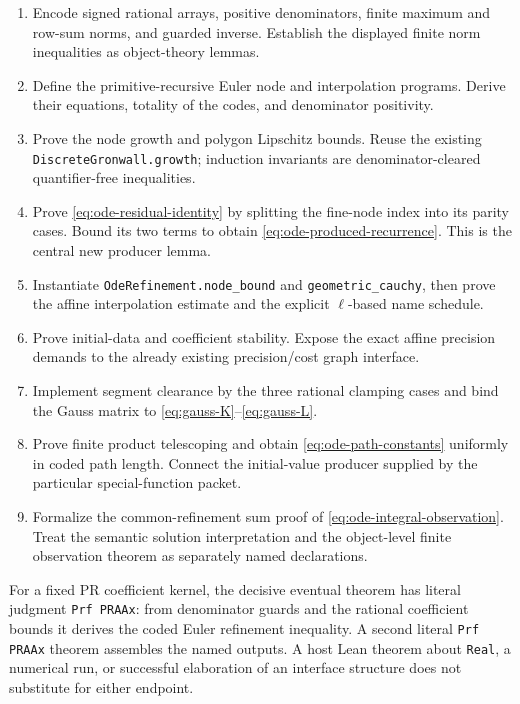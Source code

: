 \begin{enumerate}
\item Encode signed rational arrays, positive denominators, finite maximum
and row-sum norms, and guarded inverse. Establish the displayed finite norm
inequalities as object-theory lemmas.
\item Define the primitive-recursive Euler node and interpolation programs.
Derive their equations, totality of the codes, and denominator positivity.
\item Prove the node growth and polygon Lipschitz bounds. Reuse the existing
\nolinkurl{DiscreteGronwall.growth}; induction invariants are denominator-cleared
quantifier-free inequalities.
\item Prove \eqref{eq:ode-residual-identity} by splitting the fine-node index
into its parity cases. Bound its two terms to obtain
\eqref{eq:ode-produced-recurrence}. This is the central new producer lemma.
\item Instantiate \texttt{OdeRefinement.node\_bound} and
\texttt{geometric\_cauchy}, then prove the affine interpolation estimate and
the explicit $\ell$-based name schedule.
\item Prove initial-data and coefficient stability. Expose the exact affine
precision demands to the already existing precision/cost graph interface.
\item Implement segment clearance by the three rational clamping cases and
bind the Gauss matrix to \eqref{eq:gauss-K}--\eqref{eq:gauss-L}.
\item Prove finite product telescoping and obtain
\eqref{eq:ode-path-constants} uniformly in coded path length. Connect the
initial-value producer supplied by the particular special-function packet.
\item Formalize the common-refinement sum proof of
\eqref{eq:ode-integral-observation}. Treat the semantic solution
interpretation and the object-level finite observation theorem as separately
named declarations.
\end{enumerate}

For a fixed PR coefficient kernel, the decisive eventual theorem has literal
judgment \texttt{Prf PRAAx}: from denominator guards and the rational
coefficient bounds it derives the coded Euler refinement inequality. A
second literal \texttt{Prf PRAAx} theorem assembles the named outputs. A
host Lean theorem about \texttt{Real}, a numerical run, or successful
elaboration of an interface structure does not substitute for either
endpoint.
